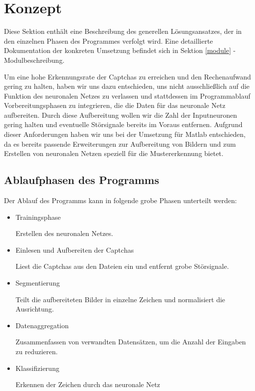 \section{Konzept}

Diese Sektion enthält eine Beschreibung des generellen Lösungsansatzes, der in
den einzelnen Phasen des Programmes verfolgt wird. Eine detaillierte Dokumentation
der konkreten Umsetzung befindet sich in Sektion \ref{module} - Modulbeschreibung.

Um eine hohe Erkennungsrate der Captchas zu erreichen und den Rechenaufwand
gering zu halten, haben wir uns dazu entschieden,
uns nicht ausschließlich auf die Funktion des neuronalen Netzes zu verlassen
und stattdessen im Programmablauf Vorbereitungsphasen zu integrieren, die die
Daten für das neuronale Netz aufbereiten. Durch diese Aufbereitung wollen wir
die Zahl der Inputneuronen gering halten und eventuelle Störsignale bereits im
Voraus entfernen. Aufgrund dieser Anforderungen haben wir uns bei der Umsetzung für Matlab entschieden, 
da es bereits passende Erweiterungen zur Aufbereitung von Bildern und zum
Erstellen von neuronalen Netzen speziell für die Mustererkennung bietet.


\subsection{Ablaufphasen des Programms}

Der Ablauf des Programms kann in folgende grobe Phasen unterteilt werden: 

\begin{itemize}

\item Trainingsphase

Erstellen des neuronalen Netzes.


\item Einlesen und Aufbereiten der Captchas

Liest die Captchas aus den Dateien ein und entfernt grobe Störsignale.


\item Segmentierung

Teilt die aufbereiteten Bilder in einzelne Zeichen und normalisiert die
Ausrichtung.


\item Datenaggregation

Zusammenfassen von verwandten Datensätzen, um die Anzahl der Eingaben zu reduzieren.


\item Klassifizierung

Erkennen der Zeichen durch das neuronale Netz

\end{itemize}


